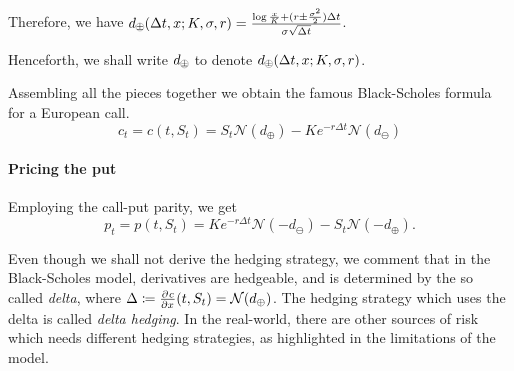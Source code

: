 Therefore, we have $ d_{\opm} ( \Delta t, x; K, \sigma, r )  =  \frac{ \log \frac{x}{K} + ( r \pm \frac{\sigma^2}{2} ) \Delta t }{ \sigma \sqrt{\Delta t} } $.

Henceforth, we shall write $ d_{\opm} $ to denote $ d_{\opm} ( \Delta t, x; K, \sigma, r ) $.

Assembling all the pieces together we obtain the famous Black-Scholes formula for a European call.
\begin{equation}
	\label{eq:continous-call-pr}
	c_t = c(t, S_t) = S_t \mathcal{N}(d_{\oplus}) - K e^{-r \Delta t} \mathcal{N}(d_{\ominus})
\end{equation}


\paragraph{Pricing the put}
Employing the call-put parity, we get
\begin{equation}
	\label{eq:continous-put-pr}
	p_t = p(t, S_t) = K e^{-r \Delta t} \mathcal{N}(- d_{\ominus}) - S_t \mathcal{N}(- d_{\oplus}).
\end{equation}


\begin{rem}[Hedging]
	Even though we shall not derive the hedging strategy, we comment that in the Black-Scholes model, derivatives are hedgeable, and is determined by the so called \emph{delta}, where $ \Delta \coloneqq \pd{c}{x}(t,S_t) = \mathcal{N}(d_{\oplus}) $. The hedging strategy which uses the delta is called \emph{delta hedging}. In the real-world, there are other sources of risk which needs different hedging strategies, as highlighted in the limitations of the model.
\end{rem}


